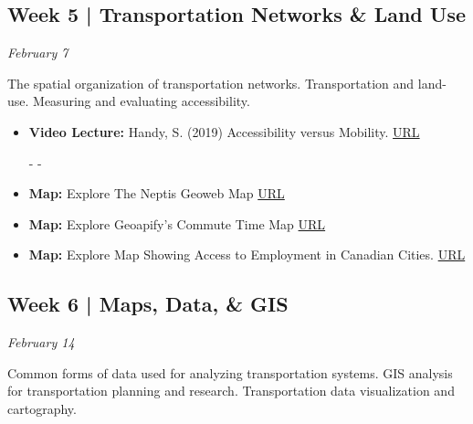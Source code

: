 \documentclass[11pt]{article}
\begin{document}
	
	
	
	
	
	
	
	
	
	\subsection*{Week 5 | Transportation Networks \& Land Use}
	
	\textit{February 7}
	
	The spatial organization of transportation networks. Transportation and land-use. Measuring and evaluating accessibility.
	
	\begin{itemize}
		
		\item \textbf{Video Lecture:} Handy, S. (2019) Accessibility versus Mobility.  \href{https://www.youtube.com/watch?v=4OMv6CqrzvE}{URL}
		
		- - 
		
		\item \textbf{Map:} Explore The Neptis Geoweb Map \href{https://neptisgeoweb.org/}{URL}
		
		\item \textbf{Map:} Explore Geoapify's Commute Time Map \href{https://commutetimemap.com/}{URL}
		
		\item \textbf{Map:} Explore Map Showing Access to Employment in
		Canadian Cities. \href{https://sausy-lab.github.io/canada-transit-access/map.html}{URL}
		
		
		
	\end{itemize}
	
	
	
	
	
	
	\subsection*{Week 6 | Maps, Data, \& GIS}
	
	\textit{February 14}
		
	Common forms of data used for analyzing transportation systems. GIS analysis for transportation planning and research. Transportation data visualization and cartography.
	
\end{document}
